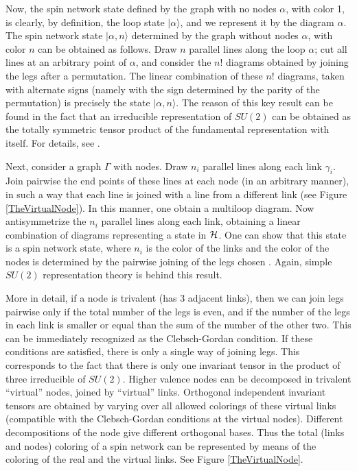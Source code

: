 \documentclass[12pt]{article}
\begin{document}
Now, the spin network state defined by the graph with no nodes 
$\alpha$, with color 1, is clearly, by definition, the loop state 
$|\alpha\rangle$, and we represent it by the diagram $\alpha$.  
The spin network state $|\alpha, n\rangle$ determined by the graph 
without nodes $\alpha$, with color $n$ can be obtained as 
follows.  Draw $n$ parallel lines along the loop $\alpha$; cut 
all lines at an arbitrary point of $\alpha$, and consider the 
$n!$ diagrams obtained by joining the legs after a permutation.  
The linear combination of these $n!$ diagrams, taken with 
alternate signs (namely with the sign determined by the parity of 
the permutation) is precisely the state $|\alpha, n\rangle$.  The 
reason of this key result can be found in the fact that an  
irreducible representation of $SU(2)$ can be obtained as the 
totally symmetric tensor product of the fundamental 
representation with itself.  For details, see 
\cite{DePietriRovelli}.

Next, consider a graph $\Gamma$ with nodes.  Draw $n_{i}$ parallel 
lines along each link $\gamma_{i}$.  Join pairwise the end points 
of these lines at each node (in an arbitrary manner), in such a 
way that each line is joined with a line from a different link 
(see Figure \ref{TheVirtualNode}).  In this manner, one obtain a 
multiloop diagram.  Now antisymmetrize the $n_{i}$ parallel lines 
along each link, obtaining a linear combination of diagrams 
representing a state in $\cal H$.  One can show that this state is 
a spin network state, where $n_{i}$ is the color of the links and 
the color of the nodes is determined by the pairwise joining of 
the legs chosen \cite{DePietriRovelli}.  Again, simple $SU(2)$ 
representation theory is behind this result.

More in detail, if a node is trivalent (has 3 adjacent links), 
then we can join legs pairwise only if the total number of the legs 
is even, and if the number of the legs in each link is smaller 
or equal than the sum of the number of the other two. This can 
be immediately recognized as the Clebsch-Gordan condition. If 
these conditions are satisfied, there is only a single way of 
joining legs. This corresponds to the fact that there is only one 
invariant tensor in the product of three irreducible of $SU(2)$. 
Higher valence nodes can be decomposed in trivalent ``virtual'' 
nodes, joined by ``virtual'' links.  Orthogonal independent 
invariant tensors are obtained by varying over all allowed 
colorings of these virtual links (compatible with the 
Clebsch-Gordan conditions at the virtual nodes). Different 
decompositions of the node give different orthogonal bases. 
Thus the total (links and nodes) coloring of a spin network can 
be represented by means of the coloring of the real and the 
virtual links. See Figure \ref{TheVirtualNode}. 
\end{document}
